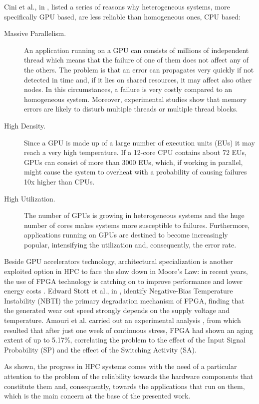 Cini et al., in \cite{10.1145/3372790}, listed a series of reasons why heterogeneous systems, more specifically GPU based, are less reliable than homogeneous ones, CPU based:
\begin{description}
\item [Massive Parallelism.] An application running on a GPU can consists of millions of independent thread which means that the failure of one of them does not affect any of the others. The problem is that an error can propagates very quickly if not detected in time and, if it lies on shared resources, it may affect also other nodes. In this circumstances, a failure is very costly compared to an homogeneous system. Moreover, experimental studies show that memory errors are likely to disturb multiple threads or multiple thread blocks.
\item[High Density.] Since a GPU is made up of a large number of execution units (EUs) it may reach a very high temperature. If a 12-core CPU contains about 72 EUs, GPUs can consist of more than 3000 EUs, which, if working in parallel, might cause the system to overheat with a probability of causing failures 10x higher than CPUs.
\item[High Utilization.] The number of GPUs is growing in heterogeneous systems and the huge number of cores makes systems more susceptible to failures. Furthermore, applications running on GPUs are destined to become increasingly popular, intensifying the utilization and, consequently, the error rate. 
\end{description}

Beside GPU accelerators technology, architectural specialization is another exploited option in HPC to face the slow down in Moore’s Law: in recent years, the use of FPGA technology is catching on to improve performance and lower energy costs \cite{insidehpc_2019}. Edward Stott et al., in \cite{5694288}, identify Negative-Bias Temperature Instability (NBTI) the primary degradation mechanism of FPGA, finding that the generated wear out speed strongly depends on the supply voltage and temperature. 
Amouri et al. carried out an experimental analysis \cite{6927390}, from which resulted that after just one week of  continuous stress, FPGA had shown an aging extent of up to 5.17\%, correlating the problem to the effect of the Input Signal Probability (SP) and the effect of the Switching Activity (SA).

As shown, the progress in HPC systems comes with the need of a particular attention to the problem of the reliability towards the hardware components that constitute them and, consequently, towards the applications that run on them, which is the main concern at the base of the presented work. 

